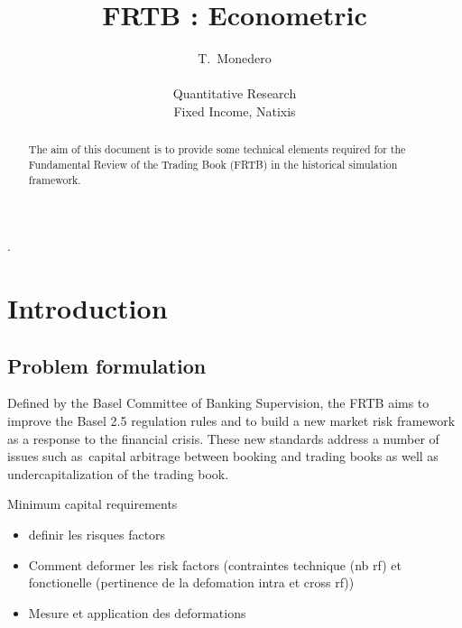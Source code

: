 \documentclass[3pt]{article}
\begin{document}
\title{FRTB : Econometric}
\author{T.\ Monedero \\
\\
Quantitative Research\\
Fixed Income, Natixis\\
}
\maketitle

\begin{abstract}
The aim of this document is to provide some technical elements required for
the Fundamental Review of the Trading Book (FRTB) in the historical
simulation framework.
\end{abstract}

\tableofcontents

.

\bigskip

\bigskip

\bigskip

\section{Introduction}

\bigskip 

\subsection{Problem formulation}

Defined by the Basel Committee of Banking Supervision, the FRTB aims to
improve the Basel 2.5 regulation rules and to build a new market risk
framework as a response to the financial crisis. These new standards address
a number of issues such as\ capital arbitrage between booking and trading
books as well as undercapitalization of the trading book.

\bigskip 

\bigskip Minimum capital requirements

\begin{itemize}
\item definir les risques factors

\item Comment deformer les risk factors (contraintes technique (nb rf) et
fonctionelle (pertinence de la defomation intra et cross rf))

\item Mesure et application des deformations
\end{itemize}
\end{document}
